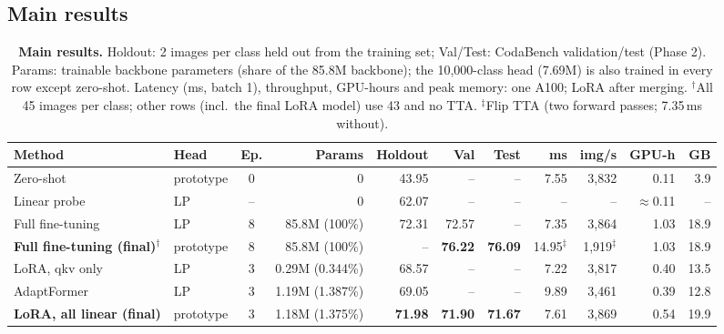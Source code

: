 \subsection{Main results}
\label{sec:main}

\begin{table}[t]
  \caption{\textbf{Main results.}
  Holdout: 2 images per class held out from the training set; Val/Test: CodaBench validation/test (Phase 2).
  Params: trainable backbone parameters (share of the 85.8M backbone); the 10,000-class head (7.69M) is also trained in every row except zero-shot.
  Latency (ms, batch 1), throughput, GPU-hours and peak memory: one A100; LoRA after merging.
  $^\dagger$All 45 images per class; other rows (incl.\ the final LoRA model) use 43 and no TTA. $^\ddagger$Flip TTA (two forward passes; 7.35\,ms without).}
  \label{tab:main}
  \centering
  \scriptsize
  \setlength{\tabcolsep}{3pt}
  \begin{tabular}{@{}llcrrrrrrrr@{}}
    \toprule
    Method & Head & Ep. & Params & Holdout & Val & Test & ms & img/s & GPU-h & GB \\
    \midrule
    Zero-shot & prototype & 0 & 0 & 43.95 & -- & -- & 7.55 & 3,832 & 0.11 & 3.9 \\
    Linear probe & LP & -- & 0 & 62.07 & -- & -- & -- & -- & $\approx$0.11 & -- \\
    \midrule
    Full fine-tuning & LP & 8 & 85.8M (100\%) & 72.31 & 72.57 & -- & 7.35 & 3,864 & 1.03 & 18.9 \\
    \textbf{Full fine-tuning (final)}$^\dagger$ & prototype & 8 & 85.8M (100\%) & -- & \textbf{76.22} & \textbf{76.09} & 14.95$^\ddagger$ & 1,919$^\ddagger$ & 1.03 & 18.9 \\
    \midrule
    LoRA, qkv only & LP & 3 & 0.29M (0.344\%) & 68.57 & -- & -- & 7.22 & 3,817 & 0.40 & 13.5 \\
    AdaptFormer & LP & 3 & 1.19M (1.387\%) & 69.05 & -- & -- & 9.89 & 3,461 & 0.39 & 12.8 \\
    \textbf{LoRA, all linear (final)} & prototype & 3 & 1.18M (1.375\%) & \textbf{71.98} & \textbf{71.90} & \textbf{71.67} & 7.61 & 3,869 & 0.54 & 19.9 \\
    \bottomrule
  \end{tabular}
\end{table}

